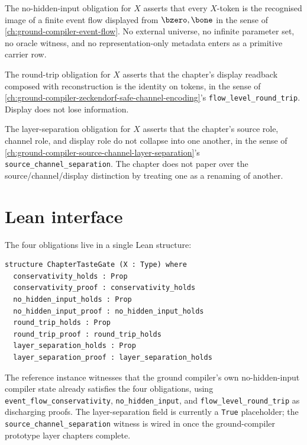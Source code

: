 \begin{definition}
\label{def:taste-gate-no-hidden-input}
The no-hidden-input obligation for $X$ asserts that every $X$-token is
the recognised image of a finite event flow displayed from $\bzero,\bone$
in the sense of \autoref{ch:ground-compiler-event-flow}. No external
universe, no infinite parameter set, no oracle witness, and no
representation-only metadata enters as a primitive carrier row.
\end{definition}

\begin{definition}
\label{def:taste-gate-round-trip}
The round-trip obligation for $X$ asserts that the chapter's display
readback composed with reconstruction is the identity on tokens, in the
sense of \autoref{ch:ground-compiler-zeckendorf-safe-channel-encoding}'s
\texttt{flow\_level\_round\_trip}. Display does not lose information.
\end{definition}

\begin{definition}
\label{def:taste-gate-layer-separation}
The layer-separation obligation for $X$ asserts that the chapter's
source role, channel role, and display role do not collapse into one
another, in the sense of
\autoref{ch:ground-compiler-source-channel-layer-separation}'s
\texttt{source\_channel\_separation}. The chapter does not paper over
the source/channel/display distinction by treating one as a renaming of
another.
\end{definition}

\section{Lean interface}
\label{sec:taste-gate-lean-interface}

The four obligations live in a single Lean structure:

\begin{verbatim}
structure ChapterTasteGate (X : Type) where
  conservativity_holds : Prop
  conservativity_proof : conservativity_holds
  no_hidden_input_holds : Prop
  no_hidden_input_proof : no_hidden_input_holds
  round_trip_holds : Prop
  round_trip_proof : round_trip_holds
  layer_separation_holds : Prop
  layer_separation_proof : layer_separation_holds
\end{verbatim}

The reference instance witnesses that the ground compiler's own
no-hidden-input compiler state already satisfies the four obligations,
using \texttt{event\_flow\_conservativity}, \texttt{no\_hidden\_input},
and \texttt{flow\_level\_round\_trip} as discharging proofs. The
layer-separation field is currently a \texttt{True} placeholder; the
\texttt{source\_channel\_separation} witness is wired in once the
ground-compiler prototype layer chapters complete.

